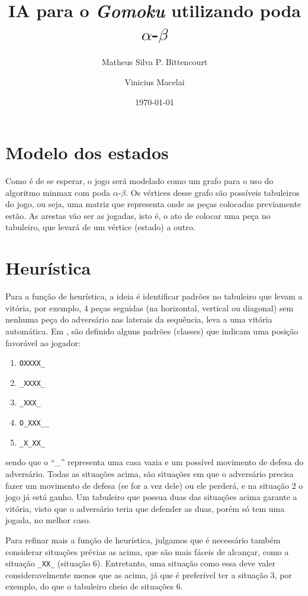 \documentclass{article}
\title{IA para o \textit{Gomoku} utilizando poda $\alpha$-$\beta$}
\author{Matheus Silva P. Bittencourt \and Vinicius Macelai}
\date{\today}
\begin{document}
\maketitle

\section{Modelo dos estados}

Como é de se esperar, o jogo será modelado como um grafo para o uso do
algoritmo minmax com poda $\alpha$-$\beta$. Os vértices desse grafo são
possíveis tabuleiros do jogo, ou seja, uma matriz que representa onde as peças
colocadas previamente estão. As arestas vão ser as jogadas, isto é, o ato de
colocar uma peça no tabuleiro, que levará de um vértice (estado) a outro.

\section{Heurística}

Para a função de heurística, a ideia é identificar padrões no tabuleiro que
levam a vitória, por exemplo, 4 peças seguidas (na horizontal, vertical ou
diagonal) sem nenhuma peça do adversário nas laterais da sequência, leva a uma
vitória automática. Em \cite{allis1993go}, são definido alguns padrões
(classes) que indicam uma posição favorável ao jogador:

\begin{enumerate}
	\item \texttt{OXXXX\_}
	\item \texttt{\_XXXX\_}
	\item \texttt{\_XXX\_}
	\item \texttt{O\_XXX\_\_}
	\item \texttt{\_X\_XX\_}
\end{enumerate}

sendo que o ``\_'' representa uma casa vazia e um possível movimento de defesa
do adversário. Todas as situações acima, são situações em que o adversário
precisa fazer um movimento de defesa (se for a vez dele) ou ele perderá, e na
situação 2 o jogo já está ganho. Um tabuleiro que possua duas das situações
acima garante a vitória, visto que o adversário teria que defender as duas,
porém só tem uma jogada, no melhor caso.

Para refinar mais a função de heurística, julgamos que é necessário também
considerar situações prévias as acima, que são mais fáceis de alcançar, como a
situação \texttt{\_XX\_} (situação 6). Entretanto, uma situação como essa deve
valer consideravelmente menos que as acima, já que é preferível ter a situação
3, por exemplo, do que o tabuleiro cheio de situações 6.
\end{document}
